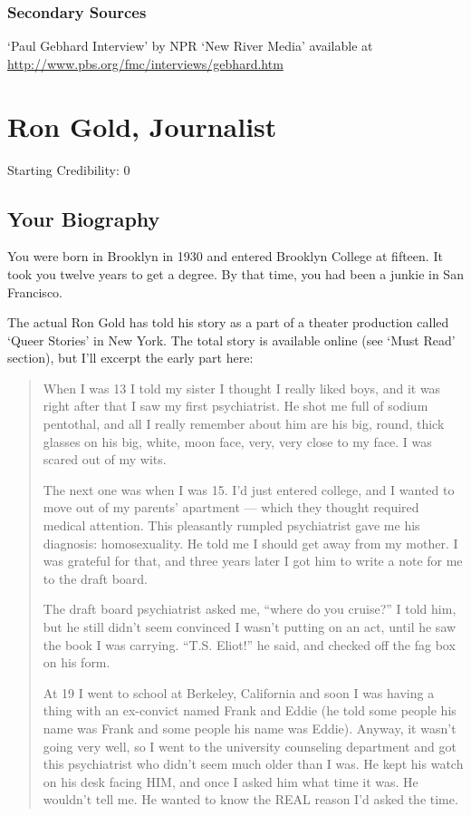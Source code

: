 \begin{refsection}
\subsection{Secondary Sources}
\label{secondarysources}

`Paul Gebhard Interview' by NPR `New River Media' available at \url{http://www.pbs.org/fmc/interviews/gebhard.htm}

\chapter{Ron Gold, Journalist}
\label{rongoldjournalist}

Starting Credibility: 0

\section{Your Biography}
\label{yourbiography}

You were born in Brooklyn in 1930 and entered Brooklyn College at fifteen. It took you twelve years to get a degree. By that time, you had been a junkie in San Francisco.

The actual Ron Gold has told his story as a part of a theater production called `Queer Stories' in New York. The total story is available online (see `Must Read' section), but I'll excerpt the early part here:

\begin{quote}

When I was 13 I told my sister I thought I really liked boys, and it was right after that I saw my first psychiatrist. He shot me full of sodium pentothal, and all I really remember about him are his big, round, thick glasses on his big, white, moon face, very, very close to my face. I was scared out of my wits.

The next one was when I was 15. I'd just entered college, and I wanted to move out of my parents' apartment — which they thought required medical attention. This pleasantly rumpled psychiatrist gave me his diagnosis: homosexuality. He told me I should get away from my mother. I was grateful for that, and three years later I got him to write a note for me to the draft board.

The draft board psychiatrist asked me, ``where do you cruise?'' I told him, but he still didn't seem convinced I wasn't putting on an act, until he saw the book I was carrying. ``T.S. Eliot!'' he said, and checked off the fag box on his form.

At 19 I went to school at Berkeley, California and soon I was having a thing with an ex-convict named Frank and Eddie (he told some people his name was Frank and some people his name was Eddie). Anyway, it wasn't going very well, so I went to the university counseling department and got this psychiatrist who didn't seem much older than I was. He kept his watch on his desk facing HIM, and once I asked him what time it was. He wouldn't tell me. He wanted to know the REAL reason I'd asked the time.


\end{quote}
\end{refsection}
